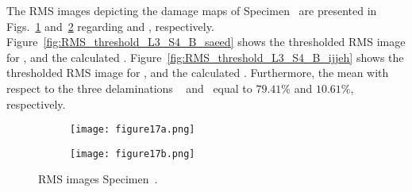The RMS images depicting the damage maps of Specimen~ are presented in Figs.~\ref{fig:RMS_L3_S4_B_saeed} and~\ref{fig:RMS_L3_S4_B_ijjeh} regarding \DIFdelbegin {}\DIFdelend \DIFaddbegin {}\DIFaddend {} and \DIFdelbegin {}\DIFdelend \DIFaddbegin {}\DIFaddend {}, respectively.
Figure~\ref{fig:RMS_threshold_L3_S4_B_saeed} shows the thresholded RMS image for \DIFdelbegin {}\DIFdelend \DIFaddbegin {}\DIFaddend {}, and the calculated \DIFdelbegin {}\DIFdelend \DIFaddbegin {}\DIFaddend .
Figure~\ref{fig:RMS_threshold_L3_S4_B_ijjeh} shows the thresholded RMS image for \DIFdelbegin {}\DIFdelend \DIFaddbegin {}\DIFaddend {}, and the calculated \DIFdelbegin {}\DIFdelend \DIFaddbegin {}\DIFaddend .
Furthermore, the mean \DIFdelbegin {}\DIFdelend \DIFaddbegin {}\DIFaddend with respect to the three delaminations \DIFdelbegin {}\DIFdelend \DIFaddbegin {}\DIFaddend ~ and~ equal to \(79.41\%\) and \(10.61\%\), respectively.
\begin{figure} [!h]
	\begin{subfigure}[b]{.49\textwidth}
		\centering
		\DIFdelbeginFL %
\DIFdelendFL \DIFaddbeginFL \texttt{[image: figure17a.png]}
		\DIFaddendFL \caption{\DIFdelbeginFL {}\DIFdelendFL \DIFaddbeginFL {}\DIFaddendFL {}\DIFdelbeginFL {}\DIFdelendFL }
		\label{fig:RMS_L3_S4_B_saeed}
	\end{subfigure}
	\hfill
	\begin{subfigure}[b]{.49\textwidth}
		\centering
		\DIFdelbeginFL %
\DIFdelendFL \DIFaddbeginFL \texttt{[image: figure17b.png]}
		\DIFaddendFL \caption{\DIFdelbeginFL {}\DIFdelendFL \DIFaddbeginFL {}\DIFaddendFL {}\DIFdelbeginFL {}\DIFdelendFL } 
		\label{fig:RMS_L3_S4_B_ijjeh}
	\end{subfigure}
	\caption{RMS images \DIFdelbeginFL {}\DIFdelendFL \DIFaddbeginFL {}\DIFaddendFL Specimen~.}
	\label{fig:RMS_L3_S4_B__images}
\end{figure} 

